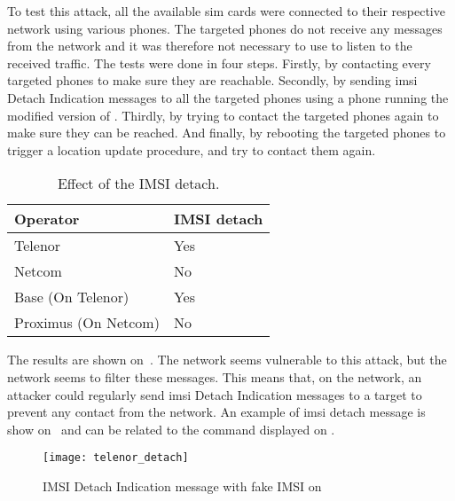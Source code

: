       To test this attack, all the available \gls{sim} cards were
      connected to their respective network using various phones. The
      targeted phones do not receive any messages from the network and
      it was therefore not necessary to use  to listen
      to the received traffic. The tests were done in four steps.
      Firstly, by contacting every targeted phones to make sure they are
      reachable. Secondly, by sending \gls{imsi} Detach Indication
      messages to all the targeted phones using a phone running the
      modified version of . Thirdly, by trying to
      contact the targeted phones again to make sure they can be
      reached. And finally, by rebooting the targeted phones to trigger
      a location update procedure, and try to contact them again.

      \begin{table}[h]
        \centering
        \begin{tabular}{@{}ll@{}}
          \toprule
          Operator             & IMSI detach\\
          \midrule
          Telenor              & Yes  \\
          Netcom               & No   \\
          Base (On Telenor)    & Yes  \\            
          Proximus (On Netcom) & No   \\
          \bottomrule
        \end{tabular}
        \caption{Effect of the IMSI detach.}
        \label{tab:imsi_detach}
      \end{table}

      The results are shown on~. The
       network seems vulnerable to this attack, but the
       network seems to filter these messages. This means
      that, on the  network, an attacker could regularly
      send \gls{imsi} Detach Indication messages to a target to prevent
      any contact from the network. An example of \gls{imsi} detach
      message is show on~ and can be related to
      the command displayed on .

      \begin{figure}
        \centering
        \texttt{[image: telenor\_detach]}
        \caption{IMSI Detach Indication message with fake IMSI on }
        \label{fig:telenor_detach}
      \end{figure}


